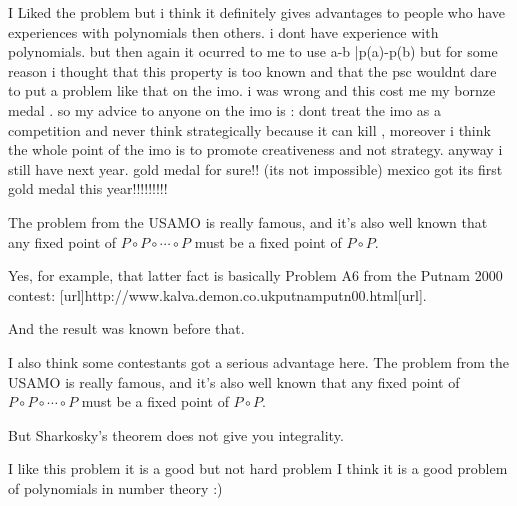 \begin{solution}
	I  Liked  the problem   but i  think  it definitely  gives advantages to people  who  have  experiences  with  polynomials  then  others.  i  dont have experience  with  polynomials.  but  then  again  it  ocurred  to me to  use  a-b |p(a)-p(b)  but for  some reason  i  thought that  this property  is too  known and that  the  psc wouldnt dare to  put  a problem  like that  on the imo.   i  was wrong  and  this  cost  me  my  bornze medal . so  my  advice  to anyone on the imo  is :  dont treat  the imo  as a competition  and  never  think  strategically  because  it can  kill  , moreover i  think  the whole point  of the imo  is to promote creativeness and  not  strategy. 
anyway i still  have next  year.   gold medal  for sure!!  (its not impossible)  mexico  got its  first  gold  medal  this year!!!!!!!!!
\end{solution}



\begin{solution}
	\begin{tcolorbox}The problem from the USAMO is really famous, and it's also well known that any fixed point of $P \circ P \circ \cdots \circ P$ must be a fixed point of $P \circ P$.\end{tcolorbox}
Yes, for example, that latter fact is basically Problem A6 from the Putnam 2000 contest:
[url]http://www.kalva.demon.co.uk\/putnam\/putn00.html[\/url].

And the result was known before that.
\end{solution}



\begin{solution}
	\begin{tcolorbox}I also think some contestants got a serious advantage here. The problem from the USAMO is really famous, and it's also well known that any fixed point of $P \circ P \circ \cdots \circ P$ must be a fixed point of $P \circ P$.\end{tcolorbox}

But Sharkosky's theorem does not give you integrality.
\end{solution}



\begin{solution}
	I like this problem 
it is a good but not hard problem 
I think it is a good problem of polynomials in number theory :)
\end{solution}



